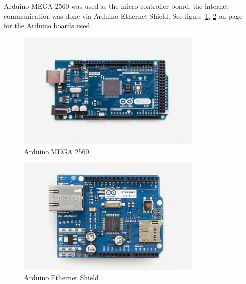 \documentclass[12pt,]{article}
\numberwithin{figure}{section}
\begin{document}
Arduino MEGA 2560 was used as the micro-controller board, the internet communication was done via Arduino Ethernet Shield, See figure~\ref{fig:16}, \ref{fig:34} on page~\pageref{fig:16} for the Arduino boards used.
\begin{figure}
	\begin{center}
		\includegraphics[width=0.8\textwidth]{15}
	\end{center}
    \caption{Arduino MEGA 2560 \cite{Arduino}}
	\label{fig:16}
\end{figure}
\begin{figure}
	\begin{center}
		\includegraphics[width=0.8\textwidth]{16}
	\end{center}
    \caption{Arduino Ethernet Shield \cite{Arduino}}
	\label{fig:34}
\end{figure}
\end{document}
